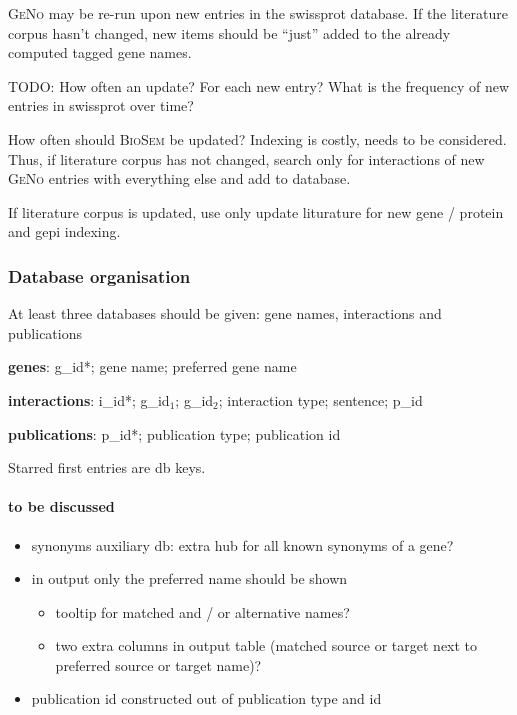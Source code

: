 \documentclass[a4paper,10pt]{article}
\begin{document}
\textsc{GeNo} may be re-run upon new entries in the swissprot database. If the literature corpus hasn't changed, new items should be ``just'' added to the already computed tagged gene names. 

TODO: How often an update? For each new entry? What is the frequency of new entries in swissprot over time?

How often should \textsc{BioSem} be updated? Indexing is costly, needs to be considered. Thus, if literature corpus has not changed, search only for interactions of new \textsc{GeNo} entries with everything else and add to database.

If literature corpus is updated, use only update liturature for new gene / protein and gepi indexing.

\subsubsection{Database organisation}

At least three databases should be given: gene names, interactions and publications

\textbf{genes}: g\_id*; gene name; preferred gene name \smallskip

\textbf{interactions}: i\_id*; g\_id$_1$; g\_id$_2$; interaction type; sentence; p\_id \smallskip

\textbf{publications}: p\_id*; publication type; publication id

\bigskip
Starred first entries are db keys.

\paragraph{to be discussed}

\begin{itemize}
 \item synonyms auxiliary db: extra hub for all known synonyms of a gene?
 \item in output only the preferred name should be shown
 \begin{itemize}
   \item tooltip for matched and / or alternative names?
   \item two extra columns in output table (matched source or target next to preferred source or 
target name)?
 \end{itemize}
 \item publication id constructed out of publication type and id
\end{itemize}
\end{document}
